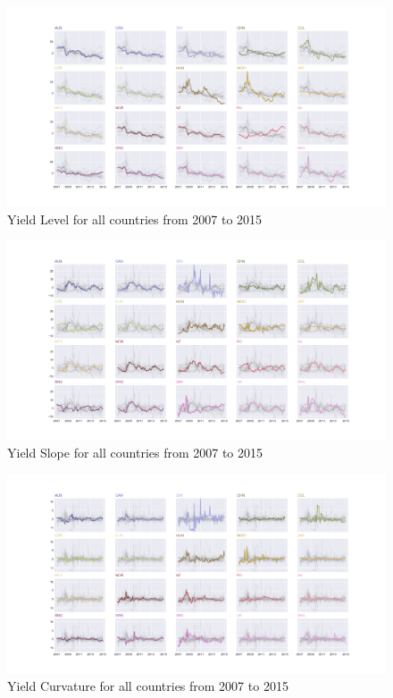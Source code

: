 \documentclass{article}
\begin{document}
\begin{figure}[H]
    \centering
    \hspace*{-2.5in}
    \includegraphics[scale = .58]{images/direction/yield_level.png}
    \caption{Yield Level for all countries from 2007 to 2015}
    \label{simulationfigure}
\end{figure}

\begin{figure}[H]
    \centering
    \hspace*{-2.5in}
    \includegraphics[scale = .58]{images/direction/yield_slope.png}
    \caption{Yield Slope for all countries from 2007 to 2015}
    \label{simulationfigure}
\end{figure}

\begin{figure}[H]
    \centering
    \hspace*{-2.5in}
    \includegraphics[scale = .58]{images/direction/yield_curvature.png}
    \caption{Yield Curvature for all countries from 2007 to 2015}
    \label{simulationfigure}
\end{figure}
\end{document}
